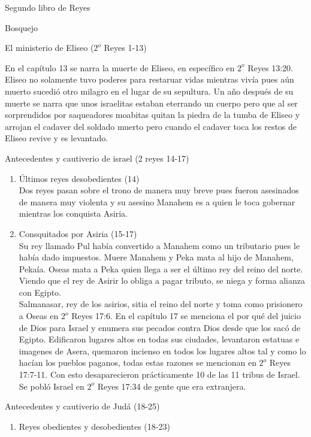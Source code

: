 \begin{section}{Segundo libro de Reyes}
\begin{subsection}{Bosquejo}
\begin{subsubsection}{El ministerio de Eliseo ($2^{o}$ Reyes 1-13)}
\begin{enumerate}
En el capítulo 13 se narra la muerte de Eliseo, en específico en $2^{o}$ Reyes 13:20. Eliseo no solamente tuvo poderes para restaruar vidas mientras vivía pues aún muerto sucedió otro milagro en el lugar de su sepultura. Un año después de su muerte se narra que unos israelitas estaban eterrando un cuerpo pero que al ser sorprendidos por saqueadores moabitas quitan la piedra de la tumba de Eliseo y arrojan el cadaver del soldado muerto pero cuando el cadaver toca los restos de Eliseo revive y es levantado.
\newpage
			\end{enumerate}
		\end{subsubsection}
		\begin{subsubsection}{Antecedentes y cautiverio de israel (2 reyes 14-17)}
			\begin{enumerate}
				\item Últimos reyes desobedientes (14)\\
				Dos reyes pasan sobre el trono de manera muy breve pues fueron asesinados de manera muy violenta y su asesino Manahem es a quien le toca gobernar mientras los conquista Asiria.
			\item Consquitados por Asiria (15-17)\\
				Su rey llamado Pul había convertido a Manahem como un tributario pues le había dado impuestos. Muere Manahem y Peka mata al hijo de Manahem, Pekaía. Oseas mata a Peka quien llega a ser el último rey del reino del norte. Viendo que el rey de Asirir lo obliga a pagar tributo, se niega y forma alianza con Egipto.\\
				Salmanasar, rey de los asirios, sitia el reino del norte y toma como prisionero a Oseas en $2^{o}$ Reyes 17:6. En el capítulo 17 se menciona el por qué del juicio de Dios para Israel y enumera sus pecados contra Dios desde que los sacó de Egipto. Edificaron lugares altos en todas sus ciudades, levantaron estatuas e imagenes de Asera, quemaron incienso en todos los lugares altos tal y como lo hacían los pueblos paganos, todas estas razones se mencionan en $2^{o}$ Reyes 17:7-11. Con esto desaparecieron prácticamente 10 de las 11 tribus de Israel. Se pobló Israel en $2^{o}$ Reyes 17:34 de gente que era extranjera.
			\end{enumerate}
		\end{subsubsection}
		\begin{subsubsection}{Antecedentes y cautiverio de Judá (18-25)}
			\begin{enumerate}
				\item Reyes obedientes y desobedientes (18-23)\\

\end{enumerate}
\end{subsubsection}
\end{subsection}
\end{section}
